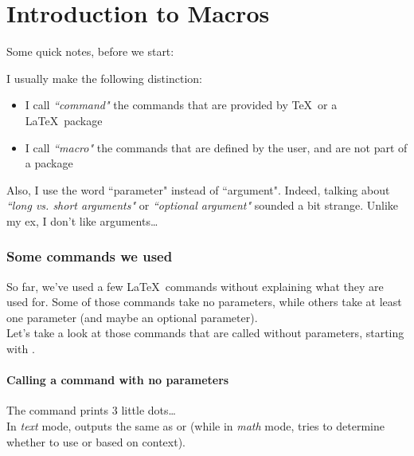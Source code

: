 
\part{Introduction to Macros} \label{macros}

Some quick notes, before we start:

\begin{note}
	I usually make the following distinction:
	\begin{itemize}
		\item I call \emph{``command"} the commands that are provided by \TeX\ or a \LaTeX\ package
		\item I call \emph{``macro"} the commands that are defined by the user, and are not part of a package
	\end{itemize}
\end{note}

Also, I use the word ``parameter" instead of ``argument". Indeed, talking about \emph{``long vs. short arguments"} or \emph{``optional argument"} sounded a bit strange. Unlike my ex, I don't like arguments\dots

\section{Some commands we used}

So far, we've used a few \LaTeX\ commands without explaining what they are used for.
Some of those commands take no parameters, while others take at least one parameter (and maybe an optional parameter). \\

Let's take a look at those commands that are called without parameters, starting with .

\subsection{Calling a command with no parameters} \label{calling-macros-without-parameters}

The  command prints 3 little dots\dots \\
In \emph{text} mode,  outputs the same as  or   (while in \emph{math} mode,  tries to determine whether to use  or  based on context). 

